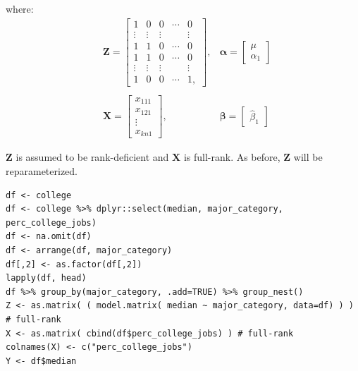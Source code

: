 \documentclass[10pt, twoside, openleft]{article}
\newcommand{\betahat}{\hat{\beta}} %
\begin{document}
where:
\begin{equation*}
\begin{aligned}
& \mathbf{Z} =
\left[ \begin{array}{ccccc}
    1 & 0 & 0 & \cdots & 0 \\
    \vdots & \vdots & \vdots &  & \vdots \\
    1 & 1 & 0 & \cdots & 0 \\
    1 & 1 & 0 & \cdots & 0 \\
    \vdots & \vdots & \vdots &  & \vdots \\
    1 & 0 & 0 & \cdots & 1, 
\end{array}\right]
, & \mathbf{\alpha} =
\left[ \begin{array}{c}
    \mu \\
    \alpha_{1}
\end{array}\right] \\
& & \\
& \mathbf{X} =
\left[ \begin{array}{ccccc}
    x_{111} \\
    x_{121} \\
    \vdots  \\
    x_{kn1}
\end{array}\right]
, & \mathbf{\beta} =
\left[ \begin{array}{c}
    \betahat_{1} 
\end{array}\right]
\end{aligned}
\end{equation*}
\smallskip

\noindent
$\mathbf{Z}$ is assumed to be rank-deficient and $\mathbf{X}$ is full-rank. As before,
$\mathbf{Z}$ will be reparameterized.
\smallskip

\begin{verbatim}
df <- college
df <- college %>% dplyr::select(median, major_category, perc_college_jobs)
df <- na.omit(df)
df <- arrange(df, major_category)
df[,2] <- as.factor(df[,2])
lapply(df, head)
df %>% group_by(major_category, .add=TRUE) %>% group_nest()
Z <- as.matrix( ( model.matrix( median ~ major_category, data=df) ) ) # full-rank
X <- as.matrix( cbind(df$perc_college_jobs) ) # full-rank
colnames(X) <- c("perc_college_jobs")
Y <- df$median
\end{verbatim}
\end{document}

